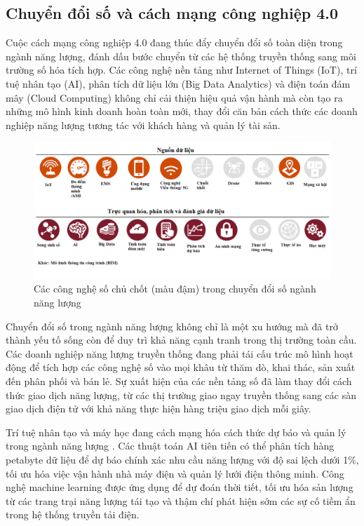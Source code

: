 \documentclass[../main.tex]{subfiles}
\begin{document}
\subsection{Chuyển đổi số và cách mạng công nghiệp 4.0}
\label{sec:digital_transformation_industry_4_0}

Cuộc cách mạng công nghiệp 4.0 đang thúc đẩy chuyển đổi số toàn diện trong ngành năng lượng, đánh dấu bước chuyển từ các hệ thống truyền thống sang môi trường số hóa tích hợp. Các công nghệ nền tảng như Internet of Things (IoT), trí tuệ nhân tạo (AI), phân tích dữ liệu lớn (Big Data Analytics) và điện toán đám mây (Cloud Computing) không chỉ cải thiện hiệu quả vận hành mà còn tạo ra những mô hình kinh doanh hoàn toàn mới, thay đổi căn bản cách thức các doanh nghiệp năng lượng tương tác với khách hàng và quản lý tài sản.

\begin{figure}
    \centering
    \includegraphics[width=1\textwidth]{Hinhve/digital_transformation_energy.png}
    \caption{Các công nghệ số chủ chốt (màu đậm) trong chuyển đổi số ngành năng lượng \cite{Benedettini2019EnergyDigital}}
    \label{fig:digital_transformation_energy}
\end{figure}

Chuyển đổi số trong ngành năng lượng không chỉ là một xu hướng mà đã trở thành yếu tố sống còn để duy trì khả năng cạnh tranh trong thị trường toàn cầu. Các doanh nghiệp năng lượng truyền thống đang phải tái cấu trúc mô hình hoạt động để tích hợp các công nghệ số vào mọi khâu từ thăm dò, khai thác, sản xuất đến phân phối và bán lẻ. Sự xuất hiện của các nền tảng số đã làm thay đổi cách thức giao dịch năng lượng, từ các thị trường giao ngay truyền thống sang các sàn giao dịch điện tử với khả năng thực hiện hàng triệu giao dịch mỗi giây.

Trí tuệ nhân tạo và máy học đang cách mạng hóa cách thức dự báo và quản lý trong ngành năng lượng \cite{li2023ai}. Các thuật toán AI tiên tiến có thể phân tích hàng petabyte dữ liệu để dự báo chính xác nhu cầu năng lượng với độ sai lệch dưới 1\%, tối ưu hóa việc vận hành nhà máy điện và quản lý lưới điện thông minh. Công nghệ machine learning được ứng dụng để dự đoán thời tiết, tối ưu hóa sản lượng từ các trang trại năng lượng tái tạo và thậm chí phát hiện sớm các sự cố tiềm ẩn trong hệ thống truyền tải điện.
\end{document}
